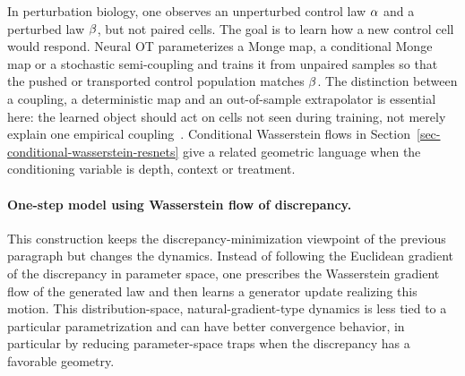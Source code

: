 \begin{example}\label{ex-perturbation-response-neural-ot}
	In perturbation biology, one observes an unperturbed control law \(\alpha\) and a perturbed law \(\beta\), but not paired cells. The goal is to learn how a new control cell would respond. Neural OT parameterizes a Monge map, a conditional Monge map or a stochastic semi-coupling and trains it from unpaired samples so that the pushed or transported control population matches \(\beta\). The distinction between a coupling, a deterministic map and an out-of-sample extrapolator is essential here: the learned object should act on cells not seen during training, not merely explain one empirical coupling~\cite{BunneKrauseCuturi2022ConditionalMonge,LuebeckBunneGutCastilloPelkmansAlvarezMelis2022NubOT,ChenHuChenHuang2024W1SingleCellOT,KleinUsciddaTheisCuturi2023GENOT}. Conditional Wasserstein flows in Section~\ref{sec-conditional-wasserstein-resnets} give a related geometric language when the conditioning variable is depth, context or treatment.
\end{example}

\paragraph{One-step model using Wasserstein flow of discrepancy.}

This construction keeps the discrepancy-minimization viewpoint of the previous paragraph but changes the dynamics. Instead of following the Euclidean gradient of the discrepancy in parameter space, one prescribes the Wasserstein gradient flow of the generated law and then learns a generator update realizing this motion. This distribution-space, natural-gradient-type dynamics is less tied to a particular parametrization and can have better convergence behavior, in particular by reducing parameter-space traps when the discrepancy has a favorable geometry.

